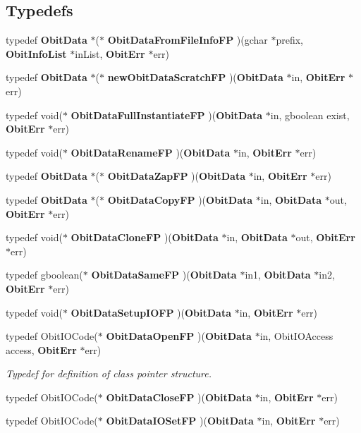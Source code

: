 \subsection*{Typedefs}
\begin{CompactItemize}
\item 
typedef {\bf Obit\-Data} $\ast$($\ast$ {\bf Obit\-Data\-From\-File\-Info\-FP} )(gchar $\ast$prefix, {\bf Obit\-Info\-List} $\ast$in\-List, {\bf Obit\-Err} $\ast$err)
\item 
typedef {\bf Obit\-Data} $\ast$($\ast$ {\bf new\-Obit\-Data\-Scratch\-FP} )({\bf Obit\-Data} $\ast$in, {\bf Obit\-Err} $\ast$err)
\item 
typedef void($\ast$ {\bf Obit\-Data\-Full\-Instantiate\-FP} )({\bf Obit\-Data} $\ast$in, gboolean exist, {\bf Obit\-Err} $\ast$err)
\item 
typedef void($\ast$ {\bf Obit\-Data\-Rename\-FP} )({\bf Obit\-Data} $\ast$in, {\bf Obit\-Err} $\ast$err)
\item 
typedef {\bf Obit\-Data} $\ast$($\ast$ {\bf Obit\-Data\-Zap\-FP} )({\bf Obit\-Data} $\ast$in, {\bf Obit\-Err} $\ast$err)
\item 
typedef {\bf Obit\-Data} $\ast$($\ast$ {\bf Obit\-Data\-Copy\-FP} )({\bf Obit\-Data} $\ast$in, {\bf Obit\-Data} $\ast$out, {\bf Obit\-Err} $\ast$err)
\item 
typedef void($\ast$ {\bf Obit\-Data\-Clone\-FP} )({\bf Obit\-Data} $\ast$in, {\bf Obit\-Data} $\ast$out, {\bf Obit\-Err} $\ast$err)
\item 
typedef gboolean($\ast$ {\bf Obit\-Data\-Same\-FP} )({\bf Obit\-Data} $\ast$in1, {\bf Obit\-Data} $\ast$in2, {\bf Obit\-Err} $\ast$err)
\item 
typedef void($\ast$ {\bf Obit\-Data\-Setup\-IOFP} )({\bf Obit\-Data} $\ast$in, {\bf Obit\-Err} $\ast$err)
\item 
typedef Obit\-IOCode($\ast$ {\bf Obit\-Data\-Open\-FP} )({\bf Obit\-Data} $\ast$in, Obit\-IOAccess access, {\bf Obit\-Err} $\ast$err)
\begin{CompactList}\small\item\em Typedef for definition of class pointer structure. \item\end{CompactList}\item 
typedef Obit\-IOCode($\ast$ {\bf Obit\-Data\-Close\-FP} )({\bf Obit\-Data} $\ast$in, {\bf Obit\-Err} $\ast$err)
\item 
typedef Obit\-IOCode($\ast$ {\bf Obit\-Data\-IOSet\-FP} )({\bf Obit\-Data} $\ast$in, {\bf Obit\-Err} $\ast$err)

\end{CompactItemize}
